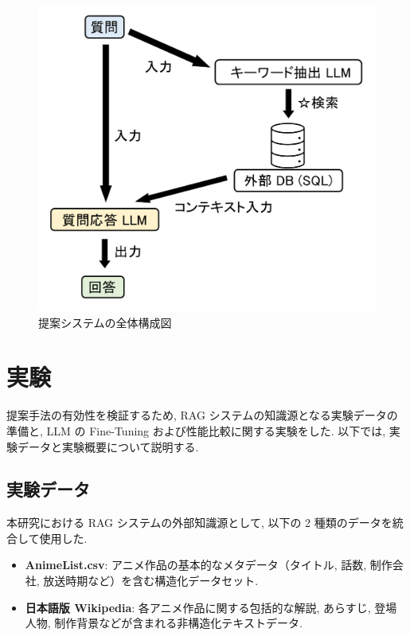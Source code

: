 \documentclass{jarticle}
\begin{document}
\begin{figure}[H]
    \centering
    \includegraphics[width=0.8\linewidth]{assets/Figure_system.png}
    \caption{提案システムの全体構成図}
    \label{fig:system_diagram}
\end{figure}

\vspace{-3mm}
\section{実験}
\vspace{-1mm}

提案手法の有効性を検証するため, RAG システムの知識源となる実験データの準備と, LLM の Fine-Tuning および性能比較に関する実験をした. 以下では, 実験データと実験概要について説明する.

\vspace{-3mm}
\subsection{実験データ}
\vspace{-1mm}

本研究における RAG システムの外部知識源として, 以下の 2 種類のデータを統合して使用した.

\begin{itemize}
\item \textbf{AnimeList.csv}: アニメ作品の基本的なメタデータ（タイトル, 話数, 制作会社, 放送時期など）を含む構造化データセット.
\item \textbf{日本語版 Wikipedia}: 各アニメ作品に関する包括的な解説, あらすじ, 登場人物, 制作背景などが含まれる非構造化テキストデータ.
\end{itemize}
\end{document}
